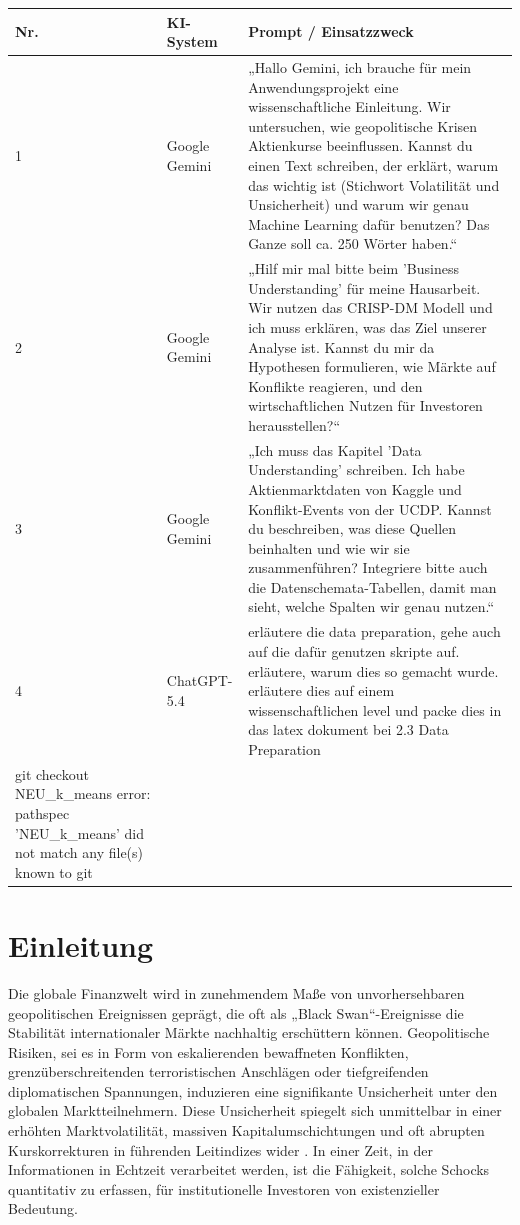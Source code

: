 \documentclass[12pt,a4paper]{article}
\begin{document}
\begin{tabular}{@{} l l p{9.5cm} @{}}
\toprule
\textbf{Nr.} & \textbf{KI-System} & \textbf{Prompt / Einsatzzweck} \\ \midrule
1 & Google Gemini & „Hallo Gemini, ich brauche für mein Anwendungsprojekt eine wissenschaftliche Einleitung. Wir untersuchen, wie geopolitische Krisen Aktienkurse beeinflussen. Kannst du einen Text schreiben, der erklärt, warum das wichtig ist (Stichwort Volatilität und Unsicherheit) und warum wir genau Machine Learning dafür benutzen? Das Ganze soll ca. 250 Wörter haben.“ \\
2 & Google Gemini & „Hilf mir mal bitte beim 'Business Understanding' für meine Hausarbeit. Wir nutzen das CRISP-DM Modell und ich muss erklären, was das Ziel unserer Analyse ist. Kannst du mir da Hypothesen formulieren, wie Märkte auf Konflikte reagieren, und den wirtschaftlichen Nutzen für Investoren herausstellen?“ \\
3 & Google Gemini & „Ich muss das Kapitel 'Data Understanding' schreiben. Ich habe Aktienmarktdaten von Kaggle und Konflikt-Events von der UCDP. Kannst du beschreiben, was diese Quellen beinhalten und wie wir sie zusammenführen? Integriere bitte auch die Datenschemata-Tabellen, damit man sieht, welche Spalten wir genau nutzen.“ \\ 
4 & ChatGPT-5.4 & erläutere die data preparation, gehe auch auf die dafür genutzen skripte auf. erläutere, warum dies so gemacht wurde. erläutere dies auf einem wissenschaftlichen level und packe dies in das latex dokument bei 2.3 Data Preparation \\

git checkout NEU_k_means
error: pathspec 'NEU_k_means' did not match any file(s) known to git\bottomrule
\end{tabular}


\newpage
{}
\setcounter{page}{1}

\section{Einleitung}
Die globale Finanzwelt wird in zunehmendem Maße von unvorhersehbaren geopolitischen Ereignissen geprägt, die oft als „Black Swan“-Ereignisse die Stabilität internationaler Märkte nachhaltig erschüttern können. Geopolitische Risiken, sei es in Form von eskalierenden bewaffneten Konflikten, grenzüberschreitenden terroristischen Anschlägen oder tiefgreifenden diplomatischen Spannungen, induzieren eine signifikante Unsicherheit unter den globalen Marktteilnehmern. Diese Unsicherheit spiegelt sich unmittelbar in einer erhöhten Marktvolatilität, massiven Kapitalumschichtungen und oft abrupten Kurskorrekturen in führenden Leitindizes wider \parencite{caldara2022measuring}. In einer Zeit, in der Informationen in Echtzeit verarbeitet werden, ist die Fähigkeit, solche Schocks quantitativ zu erfassen, für institutionelle Investoren von existenzieller Bedeutung.
\end{document}

